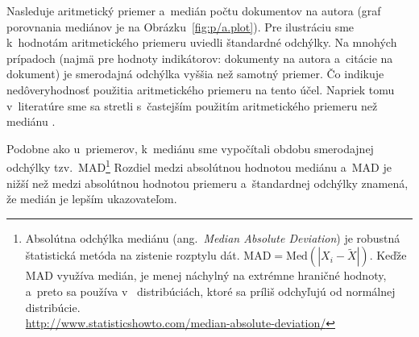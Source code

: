 Nasleduje aritmetický priemer a~medián počtu dokumentov na autora (graf
porovnania mediánov je na Obrázku~\ref{fig:p/a.plot}).  Pre ilustráciu sme
k~hodnotám aritmetického priemeru uviedli štandardné odchýlky.  Na mnohých
prípadoch (najmä pre hodnoty indikátorov: dokumenty na autora a~citácie na
dokument) je smerodajná odchýlka vyššia než samotný priemer.  Čo indikuje
nedôveryhodnosť použitia aritmetického priemeru na tento účel.  Napriek tomu
v~literatúre sme sa stretli s~častejším použitím aritmetického priemeru než
mediánu \citep{Lazaridis2010}.

Podobne ako u~priemerov, k~mediánu sme vypočítali obdobu smerodajnej odchýlky
tzv.~MAD\footnote{Absolútna odchýlka mediánu (ang.~\emph{Median Absolute
    Deviation}) je robustná štatistická metóda na zistenie rozptylu dát.
  $\mathrm{MAD} = \mathrm{Med}(|X_i - \tilde{X}|)$.  Keďže MAD využíva medián,
  je menej náchylný na extrémne hraničné hodnoty, a~preto sa používa v~
  distribúciách, ktoré sa príliš odchyľujú od normálnej
  distribúcie.\\\url{http://www.statisticshowto.com/median-absolute-deviation/}}
Rozdiel medzi absolútnou hodnotou mediánu a~MAD je nižší než medzi absolútnou
hodnotou priemeru a~štandardnej odchýlky znamená, že medián je lepším
ukazovateľom.

